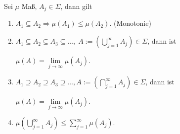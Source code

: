 \begin{prop}
\label{prop:3.11}
Sei $\mu$ Maß, $A_j\in\Sigma$, dann gilt
\begin{enumerate}[label=(\roman{*})]
  \item $A_1\subseteq A_2\Rightarrow \mu(A_1)\le \mu(A_2)$. (Monotonie)
  \item $A_1\subseteq A_2\subseteq A_3\subseteq \ldots,\;
  A:=\left(\bigcup_{j=1}^\infty A_j\right)\in\Sigma$, dann ist
  
  $\mu(A) = \lim\limits_{j\to\infty} \mu(A_j)$.
  \item $A_1\supseteq A_2\supseteq A_3\supseteq \ldots, A:=\left(
  \bigcap_{j=1}^\infty A_j \right)\in\Sigma$, dann ist
  
  $\mu(A) = \lim\limits_{j\to\infty} \mu(A_j)$.
  \item $\mu\left(\bigcup_{j=1}^\infty A_j\right)\le \sum\limits_{j=1}^\infty 
  \mu(A_j)$.\fishhere
\end{enumerate}
\end{prop}

